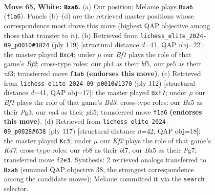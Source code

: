 \documentclass[11pt]{article}
\begin{document}
\clearpage

\begin{figure}[p]\centering
\begin{subfigure}{0.46\textwidth}\centering
\resizebox{\linewidth}{!}{%
\newchessgame
\chessboard[
  setfen={1r6/4b3/p2p2kp/B3p3/n3P2p/5P2/5K2/5B1R w - - 6 65},
  showmover=false,
  pgfstyle=straightmove, color=movearrow, markmove={f1-a6}
]}
\caption{}
\end{subfigure}\hfill
\begin{subfigure}{0.46\textwidth}\centering
\resizebox{\linewidth}{!}{%
\newchessgame
\chessboard[
  setfen={8/5bk1/7p/r4B2/2P1P2p/4KNb1/1R4P1/8 b - - 0 60},
  showmover=false,
  pgfstyle=straightmove, color=movearrow, markmove={f7-c4}
]}
\caption{}
\end{subfigure}
\\[4pt]
\begin{subfigure}{0.46\textwidth}\centering
\resizebox{\linewidth}{!}{%
\newchessgame
\chessboard[
  setfen={b7/7p/P1pk4/3p3p/P2P4/3BK1P1/8/8 w - - 0 57},
  showmover=false,
  pgfstyle=straightmove, color=movearrow, markmove={d3-h7}
]}
\caption{}
\end{subfigure}\hfill
\begin{subfigure}{0.46\textwidth}\centering
\resizebox{\linewidth}{!}{%
\newchessgame
\chessboard[
  setfen={8/5Bp1/5p2/7P/1r3P2/6P1/2bk3K/5R2 b - - 0 59},
  showmover=false,
  pgfstyle=straightmove, color=movearrow, markmove={d2-c3}
]}
\caption{}
\end{subfigure}
\caption{\textbf{Move 65, White: \texttt{Bxa6}.} (a) Our position; Melanie plays \texttt{Bxa6} (\texttt{f1a6}). Panels (b)--(d) are the retrieved master positions whose correspondence most drove this move (highest QAP objective among those that transfer to it). (b) Retrieved from \texttt{lichess\_elite\_2024-09\_p0010\#1824} (ply 119) [structural distance $d$=41, QAP obj=22]: the master played \texttt{Bxc4}; under $\mu$ our \emph{Bf1} plays the role of that game's \emph{Bf2}; cross-type roles: our \emph{p}h4 as their \emph{b}f5, our \emph{p}e5 as their \emph{n}f3; transferred move \texttt{f1a6} \textbf{(endorses this move)}. (c) Retrieved from \texttt{lichess\_elite\_2024-09\_p0010\#1370} (ply 112) [structural distance $d$=41, QAP obj=17]: the master played \texttt{Bxh7}; under $\mu$ our \emph{Bf1} plays the role of that game's \emph{Bd3}; cross-type roles: our \emph{B}a5 as their \emph{P}g3, our \emph{n}a4 as their \emph{p}h5; transferred move \texttt{f1a6} \textbf{(endorses this move)}. (d) Retrieved from \texttt{lichess\_elite\_2024-09\_p0028\#638} (ply 117) [structural distance $d$=42, QAP obj=18]: the master played \texttt{Kc3}; under $\mu$ our \emph{Kf2} plays the role of that game's \emph{Kd7}; cross-type roles: our \emph{r}b8 as their \emph{b}f7, our \emph{B}a5 as their \emph{P}g7; transferred move \texttt{f2e3}. Synthesis: 2 retrieved analogs transferred to \texttt{Bxa6} (summed QAP objective 38, the strongest correspondence among the candidate moves); Melanie committed it via the \texttt{search} selector.}
\label{fig:thought-m128}
\end{figure}
\end{document}
